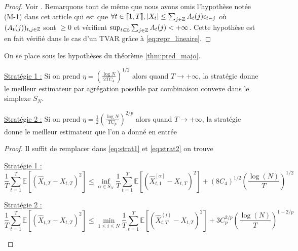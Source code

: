 \documentclass{report}
\begin{document}
\begin{proof}
Voir \citep{giraud-roueff-sanchez-aos2015}. Remarquons tout de même que nous avons omis l'hypothèse notée (M-1) dans cet article qui est que $\forall t\in {\left\llbracket 1,T \right\rrbracket}, { \left| X_t \right|} \leq \sum_{j\in \mathbb{Z}} A_t(j) \epsilon_{t-j}$ où $(A_t(j))_{t,j\in \mathbb{Z}}$ sont $\geq 0$ et vérifient $\sup_{t\in \mathbb{Z}} \sum_{j\in \mathbb{Z}} A_t(j) < +\infty$. Cette hypothèse est en fait vérifié dans le cas d'un TVAR grâce à \eqref{eq:repr_lineaire}.
\end{proof}
\begin{Cor} On se place sous les hypothèses du théorème \ref{thm:pred_majo}. 
\begin{description}
\item{\underline{Stratégie 1 :}} Si on prend $\eta = \left(\frac{\log N}{2TC_4} \right)^{1/2}$ alors quand $T\to +\infty$, la stratégie donne le meilleur estimateur par agrégation possible par combinaison convexe dans le simplexe $S_N$.
\item{\underline{Stratégie 2 :}} Si on prend $\eta = \frac{1}{2}\left(\frac{\log N}{TC_p} \right)^{2/p}$ alors quand $T\to +\infty$, la stratégie donne le meilleur estimateur que l'on a donné en entrée
\end{description}
\end{Cor}
\begin{proof}
Il suffit de remplacer dans \eqref{eq:strat1} et \eqref{eq:strat2} on trouve
\begin{description}
\item{\underline{Stratégie 1 :}}
$$
\frac{1}{T} \sum_{t=1}^T \mathbb{E}[(\hat X_{t,T}-X_{t,T})^2] \leq \inf_{\alpha \in S_N} \frac{1}{T} \sum_{t=1}^T \mathbb{E}[(\hat X_{t,1}^{[\alpha]}-X_{t,T})^2] + (8C_4)^{1/2} \left( \frac{\log(N)}{T} \right)^{1/2}
$$
\item{\underline{Stratégie 2 :}}
$$
\frac{1}{T} \sum_{t=1}^T \mathbb{E}[(\hat X_{t,T}-X_{t,T})^2] \leq \min_{1 \leq i \leq N} \frac{1}{T} \sum_{t=1}^T \mathbb{E}[(\hat X_{t,T}^{(i)}-X_{t,T})^2] + 3C_p^{2/p} \left( \frac{\log(N)}{T} \right)^{1-2/p}
$$
\end{description}
\end{proof}
\end{document}
